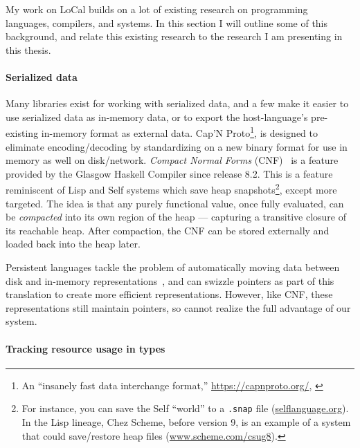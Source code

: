 \documentclass[showabstract,showacknowledgments,showpreface,showdedication,school]{iuphd}
\theoremstyle{nonumberplain}
\newcommand{\sysname}[0]{LoCal\xspace}
\newcommand{\ourcalc}[0]{\sysname}
\newcommand{\il}[1]{\lstinline[style=inline,mathescape=true];#1;}
\begin{document}
My work on \ourcalc{} builds on a lot of existing research on programming languages,
compilers, and systems. In this section I will outline some of this background, and
relate this existing research to the research I am presenting in this thesis.

\paragraph{Serialized data}

Many libraries exist for working with serialized data, and a few
make it easier to use serialized data as in-memory data, or to export the
host-language's pre-existing in-memory format as external data.
Cap'N Proto\footnote{An ``insanely fast data interchange format,''
  \url{https://capnproto.org/}, \cite{capnproto}},
is designed to eliminate encoding/decoding by
standardizing on a new binary format for use in memory as well on disk/network.
\emph{Compact Normal Forms} (CNF)~\cite{cnf-icfp15} is
a feature provided by the Glasgow Haskell Compiler since release 8.2.
This is a
feature reminiscent of Lisp and Self systems which save heap snapshots\footnote{For
  instance, you can save the Self ``world'' to a \il{.snap} file (\url{selflanguage.org}).  In the Lisp lineage, Chez
  Scheme, before version 9, is an example of a system that could save/restore heap
  files (\url{www.scheme.com/csug8}).},
except more targeted.
The idea is that any purely functional value, once fully evaluated, can be \emph{compacted}
into its own region of the heap
--- capturing a transitive closure of its reachable heap.
After compaction, the CNF can be stored externally and loaded
back into the heap later.



{Persistent languages tackle the problem of automatically moving data between disk
and in-memory representations~\cite{persistent-java,persistent-object-systems,persistent-objects-thor}, and can swizzle pointers as part of this
translation to create more efficient representations. However, like CNF, these
representations still maintain pointers, so cannot realize the full advantage of
our system.}

\paragraph{Tracking resource usage in types}
\end{document}
